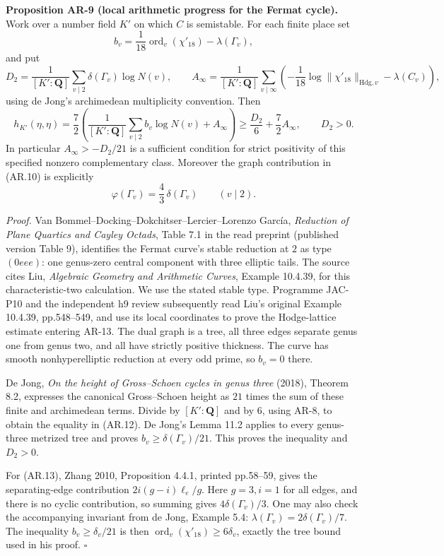\documentclass[11pt,a4paper]{article}
\begin{document}
\textbf{Proposition AR-9 (local arithmetic progress for the Fermat
cycle).} Work over a number field \(K'\) on which \(C\) is semistable.
For each finite place set \[
b_v=\frac1{18}\operatorname{ord}_v(\chi'_{18})-\lambda(\Gamma_v),
\] and put \[
D_2=\frac1{[K':\mathbf Q]}\sum_{v\mid2}\delta(\Gamma_v)\log N(v),\qquad
A_\infty=\frac1{[K':\mathbf Q]}\sum_{v\mid\infty}
\left(-\frac1{18}\log\|\chi'_{18}\|_{\mathrm{Hdg},v}-\lambda(C_v)\right),
\] using de Jong's archimedean multiplicity convention. Then \[
h_{K'}(\eta,\eta)
 =\frac72\left(
  \frac1{[K':\mathbf Q]}\sum_{v\mid2}b_v\log N(v)+A_\infty
 \right)
 \ge\frac{D_2}{6}+\frac72 A_\infty,\qquad D_2>0.
\tag{AR.12}
\] In particular \(A_\infty>-D_2/21\) is a sufficient condition for
strict positivity of this specified nonzero complementary class.
Moreover the graph contribution in (AR.10) is explicitly \[
\varphi(\Gamma_v)=\frac43\,\delta(\Gamma_v)\qquad(v\mid2).
\tag{AR.13}
\]

\emph{Proof.} Van Bommel--Docking--Dokchitser--Lercier--Lorenzo García,
\emph{Reduction of Plane Quartics and Cayley Octads}, Table 7.1 in the
read preprint (published version Table 9), identifies the Fermat curve's
stable reduction at \(2\) as type \((0eee)\): one genus-zero central
component with three elliptic tails. The source cites Liu,
\emph{Algebraic Geometry and Arithmetic Curves}, Example 10.4.39, for
this characteristic-two calculation. We use the stated stable type.
Programme JAC-P10 and the independent h9 review subsequently read Liu's
original Example 10.4.39, pp.548--549, and use its local coordinates to
prove the Hodge-lattice estimate entering AR-13. The dual graph is a
tree, all three edges separate genus one from genus two, and all have
strictly positive thickness. The curve has smooth nonhyperelliptic
reduction at every odd prime, so \(b_v=0\) there.

De Jong, \emph{On the height of Gross--Schoen cycles in genus three}
(2018), Theorem 8.2, expresses the canonical Gross--Schoen height as
\(21\) times the sum of these finite and archimedean terms. Divide by
\([K':\mathbf Q]\) and by \(6\), using AR-8, to obtain the equality in
(AR.12). De Jong's Lemma 11.2 applies to every genus-three metrized tree
and proves \(b_v\ge\delta(\Gamma_v)/21\). This proves the inequality and
\(D_2>0\).

For (AR.13), Zhang 2010, Proposition 4.4.1, printed pp.58--59, gives the
separating-edge contribution \(2i(g-i)\ell_e/g\). Here \(g=3,i=1\) for
all edges, and there is no cyclic contribution, so summing gives
\(4\delta(\Gamma_v)/3\). One may also check the accompanying invariant
from de Jong, Example 5.4: \(\lambda(\Gamma_v)=2\delta(\Gamma_v)/7\).
The inequality \(b_v\ge\delta_v/21\) is then
\(\operatorname{ord}_v(\chi'_{18})\ge6\delta_v\), exactly the tree bound
used in his proof. \(\square\)
\end{document}
